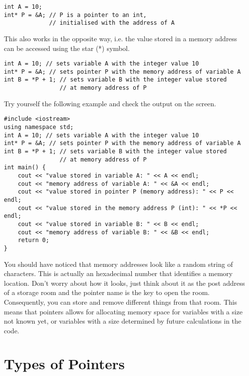 \documentclass{article}
\begin{document}
\begin{verbatim}
int A = 10;
int* P = &A; // P is a pointer to an int,
             // initialised with the address of A
\end{verbatim}

This also works in the opposite way, i.e. the value stored in a memory address can be accessed using the star (*) symbol.

\begin{verbatim}
int A = 10; // sets variable A with the integer value 10
int* P = &A; // sets pointer P with the memory address of variable A
int B = *P + 1; // sets variable B with the integer value stored
                // at memory address of P
\end{verbatim}

Try yourself the following example and check the output on the screen.

\begin{verbatim}
#include <iostream>
using namespace std;
int A = 10; // sets variable A with the integer value 10
int* P = &A; // sets pointer P with the memory address of variable A
int B = *P + 1; // sets variable B with the integer value stored
                // at memory address of P
int main() {
    cout << "value stored in variable A: " << A << endl;
    cout << "memory address of variable A: " << &A << endl;
    cout << "value stored in pointer P (memory address): " << P << endl;
    cout << "value stored in the memory address P (int): " << *P << endl;
    cout << "value stored in variable B: " << B << endl;
    cout << "memory address of variable B: " << &B << endl;
    return 0;
}
\end{verbatim}

You should have noticed that memory addresses look like a random string of characters. This is actually an hexadecimal number that identifies a memory location. Don't worry about how it looks, just think about it as the post address of a storage room and the pointer name is the key to open the room. Consequently, you can store and remove different things from that room.
This means that pointers allows for allocating memory space for variables with a size not known yet, or variables with a size determined by future calculations in the code.

\section{Types of Pointers}
\end{document}
